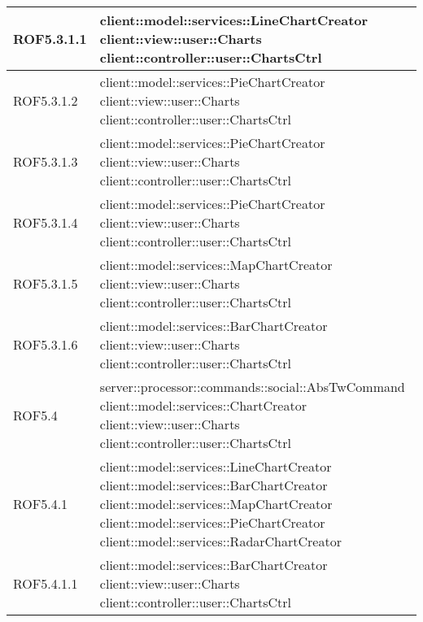 \begin{center}
\begin{longtable}{| p{2.5cm} | p{11cm} |}
\hline
ROF5.3.1.1 & client::model::services::LineChartCreator \newline client::view::user::Charts \newline client::controller::user::ChartsCtrl \\
\hline
ROF5.3.1.2 & client::model::services::PieChartCreator \newline client::view::user::Charts \newline client::controller::user::ChartsCtrl \\
\hline
ROF5.3.1.3 & client::model::services::PieChartCreator \newline client::view::user::Charts \newline client::controller::user::ChartsCtrl \\
\hline
ROF5.3.1.4 & client::model::services::PieChartCreator \newline client::view::user::Charts \newline client::controller::user::ChartsCtrl \\
\hline
ROF5.3.1.5 & client::model::services::MapChartCreator \newline client::view::user::Charts \newline client::controller::user::ChartsCtrl \\
\hline
ROF5.3.1.6 & client::model::services::BarChartCreator \newline client::view::user::Charts \newline client::controller::user::ChartsCtrl \\
\hline
ROF5.4 & server::processor::commands::social::AbsTwCommand \newline client::model::services::ChartCreator \newline client::view::user::Charts \newline client::controller::user::ChartsCtrl \\
\hline
ROF5.4.1 & client::model::services::LineChartCreator \newline client::model::services::BarChartCreator \newline client::model::services::MapChartCreator \newline client::model::services::PieChartCreator \newline client::model::services::RadarChartCreator \\
\hline
ROF5.4.1.1 & client::model::services::BarChartCreator \newline client::view::user::Charts \newline client::controller::user::ChartsCtrl \\

\end{longtable}
\end{center}
